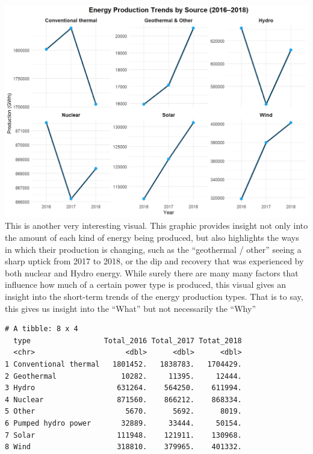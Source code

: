 \documentclass[
  letterpaper,
  DIV=11,
  numbers=noendperiod]{scrartcl}
\begin{document}
\includegraphics{../images/energy_trends.png} This is another very
interesting visual. This graphic provides insight not only into the
amount of each kind of energy being produced, but also highlights the
ways in which their production is changing, such as the ``geothermal /
other'' seeing a sharp uptick from 2017 to 2018, or the dip and recovery
that was experienced by both nuclear and Hydro energy. While surely
there are many many factors that influence how much of a certain power
type is produced, this visual gives an insight into the short-term
trends of the energy production types. That is to say, this gives us
insight into the ``What'' but not necessarily the ``Why''

\begin{verbatim}
# A tibble: 8 x 4
  type                 Total_2016 Total_2017 Totat_2018
  <chr>                     <dbl>      <dbl>      <dbl>
1 Conventional thermal   1801452.   1838783.   1704429.
2 Geothermal               10282.     11395.     12444.
3 Hydro                   631264.    564250.    611994.
4 Nuclear                 871560.    866212.    868334.
5 Other                     5670.      5692.      8019.
6 Pumped hydro power       32889.     33444.     50154.
7 Solar                   111948.    121911.    130968.
8 Wind                    318810.    379965.    401332.
\end{verbatim}
\end{document}
